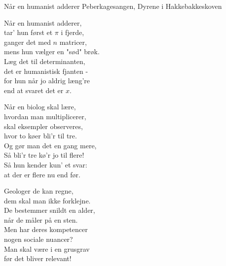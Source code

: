 \begin{song}{Når en humanist adderer}
  {} %
  {Peberkagesangen, Dyrene i Hakkebakkeskoven} %
  {\TKET{}} %
  {} %
  {\NotCCLIed} %

  \begin{SBVerse}
    Når en humanist adderer,\\
    tar’ hun først et $\pi$ i fjerde,\\
    ganger det med $n$ matricer,\\
    mens hun vælger en "sød" brøk.\\
    \medskip
    Læg det til determinanten,\\
    det er humanistisk fjanten -\\
    for hun når jo aldrig læng’re\\
    end at svaret det er $x$.
  \end{SBVerse}

  \begin{SBVerse}
    Når en biolog skal lære,\\
    hvordan man multiplicerer,\\
    skal eksempler observeres,\\
    hvor to køer bli’r til tre.\\
    \medskip
    Og gør man det en gang mere,\\
    Så bli’r tre kø’r jo til flere!\\
    Så hun kender kun’ et svar:\\
    at der er flere nu end før.
  \end{SBVerse}

  \begin{SBVerse}
    Geologer de kan regne,\\
    dem skal man ikke forklejne.\\
    De bestemmer snildt en alder,\\
    når de måler på en sten.\\
    \medskip
    Men har deres kompetencer\\
    nogen sociale nuancer?\\
    Man skal være i en grusgrav\\
    før det bliver relevant!
  \end{SBVerse}


\end{song}
